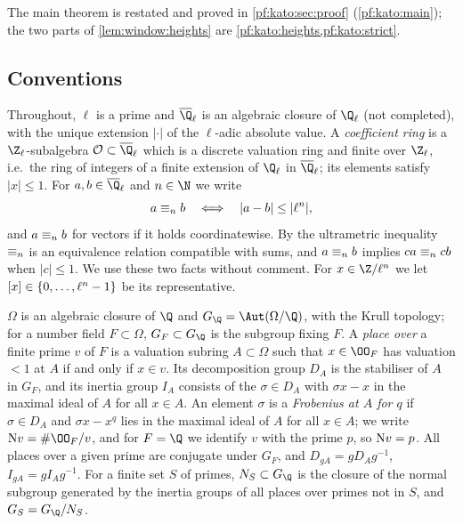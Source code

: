 The main theorem is restated and proved in \cref{pf:kato:sec:proof} (\cref{pf:kato:main}); the two parts of
\cref{lem:window:heights} are \cref{pf:kato:heights,pf:kato:strict}.

\subsection{Conventions}\label{pf:kato:sec:conv}

Throughout, $\ell$ is a prime and $\katoQlb$ is an algebraic closure of $\Q_\ell$ (not completed), with the
unique extension $|\cdot|$ of the $\ell$-adic absolute value. A \emph{coefficient ring} is a
$\Z_\ell$-subalgebra $\katoO\subset\katoQlb$ which is a discrete valuation ring and finite over $\Z_\ell$, i.e.\
the ring of integers of a finite extension of $\Q_\ell$ in $\katoQlb$; its elements satisfy $|x|\le1$. For
$a,b\in\katoQlb$ and $n\in\N$ we write
\[
  a\equiv_{n}b\quad\Longleftrightarrow\quad|a-b|\le|\ell^n|,
\]
and $a\equiv_{n} b$ for vectors if it holds coordinatewise. By the ultrametric inequality $\equiv_{n}$ is an
equivalence relation compatible with sums, and $a\equiv_{n}b$ implies $ca\equiv_{n}cb$ when $|c|\le1$. We use
these two facts without comment. For $x\in\Z/\ell^n$ we let $[x]\in\{0,\dots,\ell^n-1\}$ be its
representative.

$\Omega$ is an algebraic closure of $\Q$ and $G_\Q=\Aut(\Omega/\Q)$, with the Krull topology; for a number
field $F\subset\Omega$, $G_F\subset G_\Q$ is the subgroup fixing $F$. A \emph{place over} a finite prime $v$ of
$F$ is a valuation subring $A\subset\Omega$ such that $x\in\OO_F$ has valuation $<1$ at $A$ if and only if
$x\in v$. Its decomposition group $D_A$ is the stabiliser of $A$ in $G_F$, and its inertia group $I_A$ consists
of the $\sigma\in D_A$ with $\sigma x-x$ in the maximal ideal of $A$ for all $x\in A$. An element $\sigma$ is a
\emph{Frobenius at $A$ for $q$} if $\sigma\in D_A$ and $\sigma x-x^q$ lies in the maximal ideal of $A$ for all $x\in A$;
we write $\katoN v=\#\OO_F/v$, and for $F=\Q$ we identify $v$ with the prime $p$, so $\mathrm{N} v=p$. All places
over a given prime are conjugate under $G_F$, and $D_{gA}=gD_Ag^{-1}$, $I_{gA}=gI_Ag^{-1}$. For a finite set $S$
of primes, $N_S\subset G_\Q$ is the closure of the normal subgroup generated by the inertia groups of all
places over primes not in $S$, and $G_S=G_\Q/N_S$.

